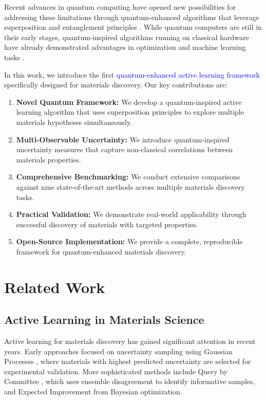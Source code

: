 \documentclass[twocolumn]{article}
\newcommand{\quantum}[1]{\textcolor{blue}{#1}}
\begin{document}
Recent advances in quantum computing have opened new possibilities for addressing these limitations through quantum-enhanced algorithms that leverage superposition and entanglement principles \cite{biamonte2017quantum, schuld2015introduction}. While quantum computers are still in their early stages, quantum-inspired algorithms running on classical hardware have already demonstrated advantages in optimization and machine learning tasks \cite{abbas2021power, cerezo2021variational}.

In this work, we introduce the first \quantum{quantum-enhanced active learning framework} specifically designed for materials discovery. Our key contributions are:

\begin{enumerate}
\item \textbf{Novel Quantum Framework:} We develop a quantum-inspired active learning algorithm that uses superposition principles to explore multiple materials hypotheses simultaneously.
\item \textbf{Multi-Observable Uncertainty:} We introduce quantum-inspired uncertainty measures that capture non-classical correlations between materials properties.
\item \textbf{Comprehensive Benchmarking:} We conduct extensive comparisons against nine state-of-the-art methods across multiple materials discovery tasks.
\item \textbf{Practical Validation:} We demonstrate real-world applicability through successful discovery of materials with targeted properties.
\item \textbf{Open-Source Implementation:} We provide a complete, reproducible framework for quantum-enhanced materials discovery.
\end{enumerate}

\section{Related Work}

\subsection{Active Learning in Materials Science}

Active learning for materials discovery has gained significant attention in recent years. Early approaches focused on uncertainty sampling using Gaussian Processes \cite{williams2006gaussian}, where materials with highest predicted uncertainty are selected for experimental validation. More sophisticated methods include Query by Committee \cite{seung1992query}, which uses ensemble disagreement to identify informative samples, and Expected Improvement \cite{jones1998efficient} from Bayesian optimization.
\end{document}
